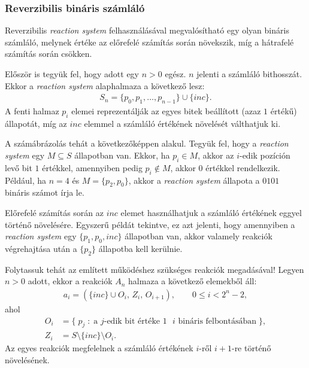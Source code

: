 \documentclass[12pt]{article}
\theoremstyle{definition}
\theoremstyle{remark}
\theoremstyle{plain}
\newcommand{\inc}{\textit{inc}}
\newcommand{\reaction}[3]{
    (#1, \, #2, \, #3)
}
\begin{document}
    \subsubsection*{Reverzibilis bináris számláló}

    Reverzibilis \textit{reaction system} felhasználásával megvalósítható egy olyan bináris számláló, melynek értéke az előrefelé számítás során növekszik, míg a hátrafelé számítás során csökken.

    Először is tegyük fel, hogy adott egy $n > 0$ egész. $n$ jelenti a számláló bithosszát. Ekkor a \textit{reaction system} alaphalmaza a következő lesz:
    \begin{align*}
        S_{n} = \{ p_{0}, p_{1}, \ldots, p_{n - 1}\} \cup \{ \textit{inc} \}.
    \end{align*}
    A fenti halmaz $p_{i}$ elemei reprezentálják az egyes bitek beállított (azaz $1$ értékű) állapotát, míg az $\textit{inc}$ elemmel a számláló értékének növelését válthatjuk ki.

    A számábrázolás tehát a következőképpen alakul. Tegyük fel, hogy a \textit{reaction system} egy $M \subseteq S$ állapotban van. Ekkor, ha $p_{i} \in M$, akkor az $i$-edik pozíción levő bit $1$ értékkel, amennyiben pedig $p_{i} \notin M$, akkor $0$ értékkel rendelkezik. Például, ha $n = 4$ és $M = \{p_{2}, p_{0}\}$, akkor a \textit{reaction system} állapota a $0101$ bináris számot írja le.
    
    Előrefelé számítás során az $\textit{inc}$ elemet használhatjuk a számláló értékének eggyel történő növelésére. Egyszerű példát tekintve, ez azt jelenti, hogy amennyiben a \textit{reaction system} egy $\{p_{1}, p_{0}, \textit{inc}\}$ állapotban van, akkor valamely reakciók végrehajtása után a $\{ p_{2} \}$ állapotba kell kerülnie.

    Folytassuk tehát az említett működéshez szükséges reakciók megadásával! Legyen $n > 0$ adott, ekkor a reakciók $A_{n}$ halmaza a következő elemekből áll:
    \begin{align*}
        a_{i} = \reaction{\{ \inc \} \cup O_{i}}{Z_{i}}{O_{i + 1}}, \qquad 0 \leq i < 2^{n} - 2,
    \end{align*}
    ahol
    \begin{align*}
        O_{i} &= \{ \; p_{j} \; : \; \text{a $j$-edik bit értéke $1$ $i$ bináris felbontásában} \; \}, \\
        Z_{i} &= S \setminus\{ \inc \} \setminus O_{i}.
    \end{align*}
    Az egyes reakciók megfelelnek a számláló értékének $i$-ről $i + 1$-re történő növelésének.
\end{document}

